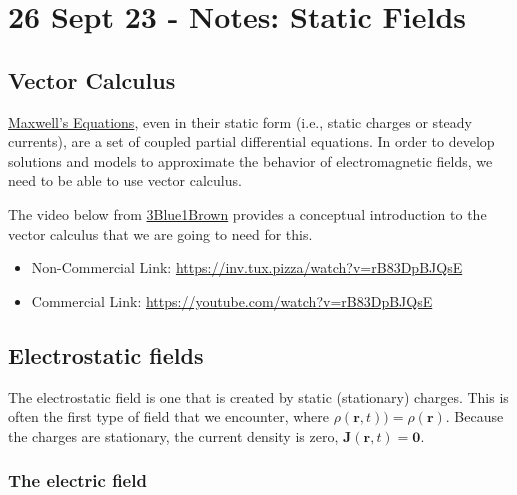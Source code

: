 \section{26 Sept 23 - Notes: Static
Fields}\label{sept-23---notes-static-fields}

\subsection{Vector Calculus}\label{vector-calculus}

\href{https://en.wikipedia.org/wiki/Maxwell\%27s_equations}{Maxwell's
Equations}, even in their static form (i.e., static charges or steady
currents), are a set of coupled partial differential equations. In order
to develop solutions and models to approximate the behavior of
electromagnetic fields, we need to be able to use vector calculus.

The video below from \href{https://www.3blue1brown.com/}{3Blue1Brown}
provides a conceptual introduction to the vector calculus that we are
going to need for this.

\href{https://inv.tux.pizza/watch?v=rB83DpBJQsE}{\pandocbounded{\texttt{[image: https://markdown-videos-api.jorgenkh.no/youtube/rB83DpBJQsE?width=720\&height=405]}}}

\begin{itemize}
\tightlist
\item
  Non-Commercial Link: \url{https://inv.tux.pizza/watch?v=rB83DpBJQsE}
\item
  Commercial Link: \url{https://youtube.com/watch?v=rB83DpBJQsE}
\end{itemize}

\subsection{Electrostatic fields}\label{electrostatic-fields}

The electrostatic field is one that is created by static (stationary)
charges. This is often the first type of field that we encounter, where
\(\rho(\mathbf{r},t)) = \rho(\mathbf{r})\). Because the charges are
stationary, the current density is zero,
\(\mathbf{J}(\mathbf{r},t) = \mathbf{0}\).

\subsubsection{The electric field}\label{the-electric-field}

